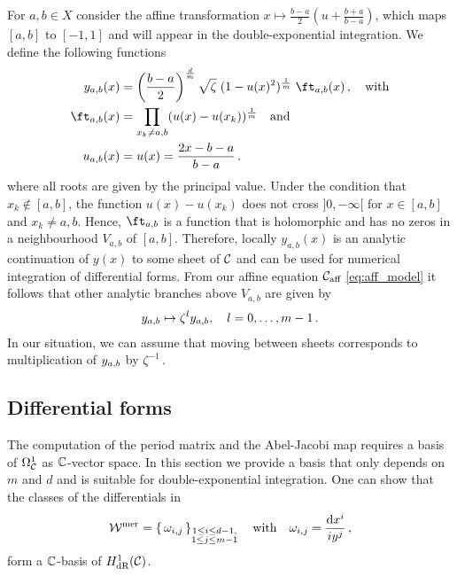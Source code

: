 \documentclass[main.tex]{subfiles}
\begin{document}
  
  For $a,b \in X$ consider the affine transformation $x \mapsto \frac{b-a}{2}\left(u+\frac{b+a}{b-a}\right)$, which maps $[a,b]$ to $[-1,1]$ and will appear in the double-exponential integration. \abstand
  We define the following functions
  \begin{align}\label{def: yab}
  \begin{split}
   \yab(x) & = \left(\frac{b-a}{2}\right)^{\frac{d}{m}} \sqrt{\zeta} \; (1 - u(x)^2)\mr \; \ft_{a,b}(x)\,, \quad \text{with} \\
   \ft_{a,b}(x) & = \prod_{x_k \ne a,b} (u(x) - u(x_k))\mr \quad \text{and} \\
   u_{a,b}(x) & = u(x) = \frac{2x-b-a}{b-a}\,.
   \end{split}
  \end{align}
  where all roots are given by the principal value. Under the condition that $x_k \not\in [a,b]$, the function $u(x)-u(x_k)$ does not cross $]0,-\infty[$
  for $x \in [a,b]$ and $x_k \ne a,b$. Hence,
  $\ft_{a,b}$ is a function that is holomorphic and has no zeros in a neighbourhood $V_{a,b}$ of $[a,b]$. \abstand Therefore, locally
 $y_{a,b}(x)$ is an analytic continuation of $y(x)$ to some sheet of $\mathcal{C}$ and can be used for numerical integration of differential forms. \abstand
  From our affine equation $\mathcal{C}_{\text{aff}}$ \eqref{eq:aff_model} it follows that other analytic branches above $V_{a,b}$ are given by
  \begin{align}
      y_{a,b} \mapsto \zeta^l y_{a,b}, \quad l = 0,\dots,m-1\,.
  \end{align}
  In our situation, we can assume that moving between sheets corresponds to multiplication of $y_{a,b}$ by $\zeta^{-1}$\,. 


  
  
  
  \newpage
  
  \subsection{Differential forms}
    The computation of the period matrix and the Abel-Jacobi map requires a basis of $\Omega^1_{\mathcal{C}}$ as $\mathbb{C}$-vector space. In this section we provide a basis that only 
   depends on $m$ and $d$ and
   is suitable for double-exponential integration.
 One can show that the classes of the differentials in
	$$\mathcal{W}^{\text{mer}} = \left\{ \, \omega_{i,j}  \, \right\}_{\substack{1 \le i \le d-1, \\ 1 \le j \le m-1}} \quad \text{with} \quad \omega_{i,j} = \frac{ \mathrm d x^i}{i y^j}\,,$$
   form a $\mathbb{C}$-basis of $H^1_{\text{dR}}(\mathcal{C})$.
     
\end{document}
